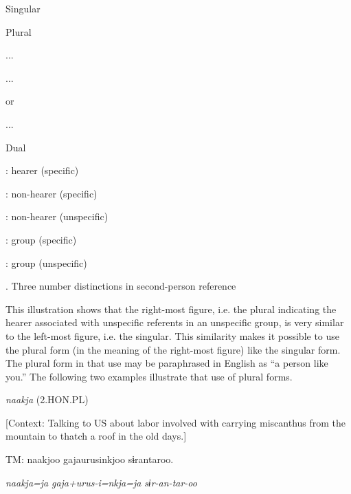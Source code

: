 
Singular

Plural

...

...

or

...

Dual


: hearer (specific)

: non-hearer (specific)

: non-hearer (unspecific)

: group (specific)

: group (unspecific)

\begin{styleBeschriftung}
\textmd{. Three number distinctions in second-person reference}
\end{styleBeschriftung}

This illustration shows that the right-most figure, i.e. the plural indicating the hearer associated with unspecific referents in an unspecific group, is very similar to the left-most figure, i.e. the singular. This similarity makes it possible to use the plural form (in the meaning of the right-most figure) like the singular form. The plural form in that use may be paraphrased in English as “a person like you.” The following two examples illustrate that use of plural forms.

\ea \label{ex:5:11}  \ea \label{ex:5:11a} \textit{naakja} (2.HON.PL)

    [Context: Talking to US about labor involved with carrying miscanthus from the mountain to thatch a roof in the old days.]

    TM:  naakjoo  gajaurusinkjoo  sɨrantaroo.

      \textit{naakja=ja}  \textit{gaja+urus-i=nkja=ja} \textit{sɨr-an-tar-oo}
                                                       
